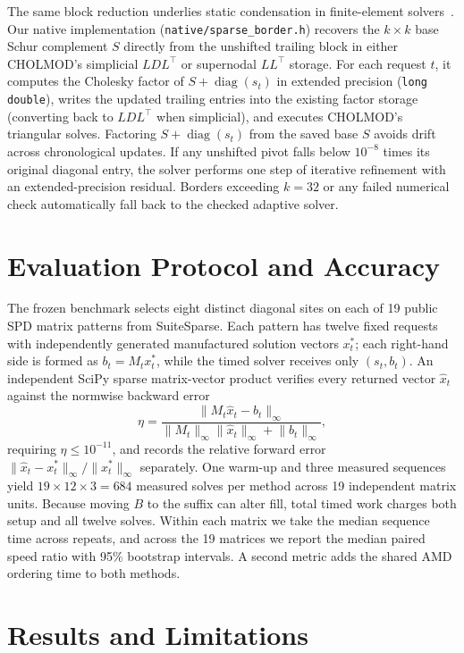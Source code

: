 \documentclass[10pt,letterpaper]{article}
\begin{document}
The same block reduction underlies static condensation in finite-element solvers~\cite{mfem}. Our native implementation (\nolinkurl{native/sparse_border.h}) recovers the $k \times k$ base Schur complement $S$ directly from the unshifted trailing block in either CHOLMOD's simplicial $LDL^\top$ or supernodal $LL^\top$ storage. For each request $t$, it computes the Cholesky factor of $S + \operatorname{diag}(s_t)$ in extended precision (\texttt{long double}), writes the updated trailing entries into the existing factor storage (converting back to $LDL^\top$ when simplicial), and executes CHOLMOD's triangular solves. Factoring $S + \operatorname{diag}(s_t)$ from the saved base $S$ avoids drift across chronological updates. If any unshifted pivot falls below $10^{-8}$ times its original diagonal entry, the solver performs one step of iterative refinement with an extended-precision residual. Borders exceeding $k = 32$ or any failed numerical check automatically fall back to the checked adaptive solver.

\section{Evaluation Protocol and Accuracy}

The frozen benchmark selects eight distinct diagonal sites on each of 19 public SPD matrix patterns from SuiteSparse. Each pattern has twelve fixed requests with independently generated manufactured solution vectors $x_t^*$; each right-hand side is formed as $b_t = M_t x_t^*$, while the timed solver receives only $(s_t, b_t)$. An independent SciPy sparse matrix-vector product verifies every returned vector $\hat{x}_t$ against the normwise backward error
\[
\eta = \frac{\lVert M_t \hat{x}_t - b_t \rVert_\infty}{\lVert M_t \rVert_\infty \lVert \hat{x}_t \rVert_\infty + \lVert b_t \rVert_\infty},
\]
requiring $\eta \leq 10^{-11}$, and records the relative forward error $\lVert \hat{x}_t - x_t^* \rVert_\infty / \lVert x_t^* \rVert_\infty$ separately. One warm-up and three measured sequences yield $19 \times 12 \times 3 = 684$ measured solves per method across 19 independent matrix units. Because moving $B$ to the suffix can alter fill, total timed work charges both setup and all twelve solves. Within each matrix we take the median sequence time across repeats, and across the 19 matrices we report the median paired speed ratio with 95\% bootstrap intervals. A second metric adds the shared AMD ordering time to both methods.

\section{Results and Limitations}
\end{document}
